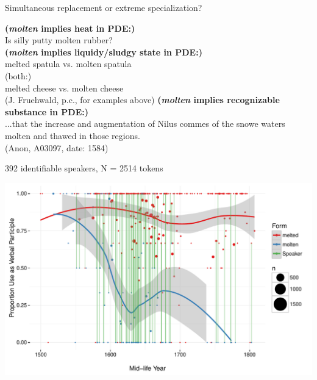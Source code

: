 \documentclass[hyperref={pdfpagelabels=false}]{beamer}
\begin{document}
\begin{frame}{Simultaneous replacement or extreme specialization?}
		\begin{exe}
			\ex \textbf{(\textsl{molten} implies heat in PDE:)}\\
			Is silly putty molten rubber?\\
			\ex \textbf{(\textsl{molten} implies liquidy/sludgy state in PDE:)}\\
			melted spatula vs. molten spatula\\
			\ex (both:)\\
			melted cheese vs. molten cheese\\
			(J. Fruehwald, p.c., for examples above)
			\ex \textbf{(\textsl{molten} implies recognizable substance in PDE:)}\\
			...that the increase and augmentation of Nilus commes of the snowe waters molten and thawed in those regions.\\
			(Anon, A03097, date: 1584)
		\end{exe}
		
\end{frame}


\begin{frame}{392 identifiable speakers, N = 2514 tokens}

\begin{center}
\includegraphics[width=1.1\textwidth]{ContextByDateAuthor.pdf}
\end{center}
\end{frame}
\end{document}

